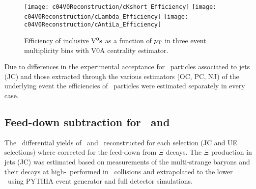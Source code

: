 \begin{figure}[htb]
\begin{center}
\texttt{[image: c04V0Reconstruction/cKshort\_Efficiency]}
\texttt{[image: c04V0Reconstruction/cLambda\_Efficiency]}
\texttt{[image: c04V0Reconstruction/cAntiLa\_Efficiency]}
\caption{Efficiency of inclusive ${\rm V}^{0}{\rm s}$ as a function of $p_{\mathrm{T}}$ in three event multiplicity bins with V0A centrality estimator.}
\label{fig:c05EffiIncV0s}
\end{center}
\end{figure}

Due to differences in the experimental acceptance for \Vzero\ particles associated to jets (JC) and those extracted through the various estimators (OC, PC, NJ) of the underlying event the efficiencies of \Vzero\ particles were estimated separately in every case.

\subsection{Feed-down subtraction for \lda\ and \alda}

The \pt\ differential yields of \lda\ and \alda\ reconstructed for each selection (JC and UE selections) where corrected for the feed-down from $\Xi$ decays. 
The $\Xi$ production in jets (JC) was estimated based on measurements of the multi-strange baryons and their decays at high-\pt\ performed in \pp\ collisions \cite{Abelev:2012jp} and extrapolated to the lower \pt\ using PYTHIA event generator and full detector simulations.
